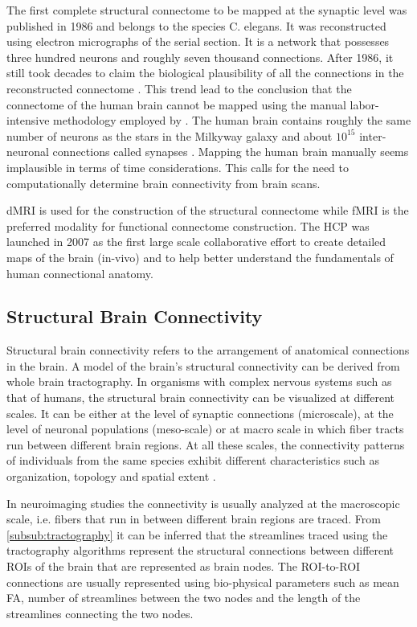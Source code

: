 \documentclass[msthesis.tex]{subfiles}
\begin{document}
The first complete structural connectome to be mapped at the synaptic level was published in 1986 and belongs to the species C. elegans. It was reconstructed using electron micrographs of the serial section. It is a network that possesses three hundred neurons and roughly seven thousand connections. After 1986, it still took decades to claim the biological plausibility of all the connections in the reconstructed connectome \citep{elegans}. This trend lead to the conclusion that the connectome of the human brain cannot be mapped using the manual labor-intensive methodology employed by \cite{white1986structure}. The human brain contains roughly the same number of neurons as the stars in the Milkyway galaxy and about $10^{15}$ inter-neuronal connections called synapses \citep{fornito2015connectomics}. Mapping the human brain manually seems implausible in terms of time considerations. This calls for the need to computationally determine brain connectivity from brain scans.

\gls{dMRI} is used for the construction of the structural connectome while \gls{fMRI} is the preferred modality for functional connectome construction. The \gls{HCP} was launched in 2007 as the first large scale collaborative effort to create detailed maps of the brain (in-vivo) and to help better understand the fundamentals of human connectional anatomy.

\subsection{Structural Brain Connectivity}
Structural brain connectivity refers to the arrangement of anatomical connections in the brain. A model of the brain's structural connectivity can be derived from whole brain tractography. In organisms with complex nervous systems such as that of humans, the structural brain connectivity can be visualized at different scales. It can be either at the level of synaptic connections (microscale), at the level of neuronal populations (meso-scale) or at macro scale in which fiber tracts run between different brain regions. At all these scales, the connectivity patterns of individuals from the same species exhibit different characteristics such as organization, topology and spatial extent \citep{Sporns:2007}.

In neuroimaging studies the connectivity is usually analyzed at the macroscopic scale, i.e. fibers that run in between different brain regions are traced. From  \autoref{subsub:tractography} it can be inferred that the streamlines traced using the tractography algorithms represent the structural connections between different \gls{ROI}s of the brain that are represented as brain nodes. The ROI-to-ROI connections are usually represented using bio-physical parameters such as mean \gls{FA}, number of streamlines between the two nodes and the length of the streamlines connecting the two nodes.
\end{document}
